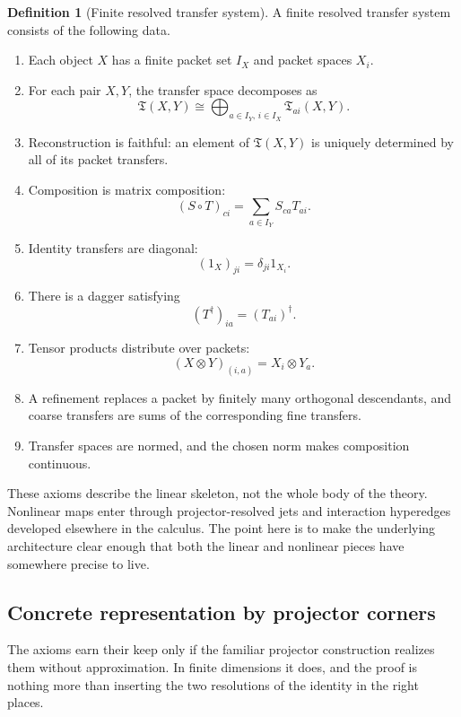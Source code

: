 \documentclass[11pt]{article}
\theoremstyle{definition}
\newtheorem{definition}[theorem]{Definition}
\theoremstyle{remark}
\begin{document}
\begin{definition}[Finite resolved transfer system]
A finite resolved transfer system consists of the following data.
\begin{enumerate}[label=\textup{(R\arabic*)}]
\item Each object \(X\) has a finite packet set \(I_X\) and packet spaces \(X_i\).
\item For each pair \(X,Y\), the transfer space decomposes as
\[
\mathfrak T(X,Y)
\cong
\bigoplus_{a\in I_Y,\,i\in I_X}
\mathfrak T_{ai}(X,Y).
\]
\item Reconstruction is faithful: an element of \(\mathfrak T(X,Y)\) is uniquely determined by all of its packet transfers.
\item Composition is matrix composition:
\[
(S\circ T)_{ci}
=
\sum_{a\in I_Y}S_{ca}T_{ai}.
\]
\item Identity transfers are diagonal:
\[
(1_X)_{ji}=\delta_{ji}1_{X_i}.
\]
\item There is a dagger satisfying
\[
(T^\dagger)_{ia}=(T_{ai})^\dagger.
\]
\item Tensor products distribute over packets:
\[
(X\otimes Y)_{(i,a)}=X_i\otimes Y_a.
\]
\item A refinement replaces a packet by finitely many orthogonal descendants, and coarse transfers are sums of the corresponding fine transfers.
\item Transfer spaces are normed, and the chosen norm makes composition continuous.
\end{enumerate}
\end{definition}

These axioms describe the linear skeleton, not the whole body of the theory.  Nonlinear maps enter through projector-resolved jets and interaction hyperedges developed elsewhere in the calculus.  The point here is to make the underlying architecture clear enough that both the linear and nonlinear pieces have somewhere precise to live.

\subsection{Concrete representation by projector corners}

The axioms earn their keep only if the familiar projector construction realizes them without approximation.  In finite dimensions it does, and the proof is nothing more than inserting the two resolutions of the identity in the right places.
\end{document}
